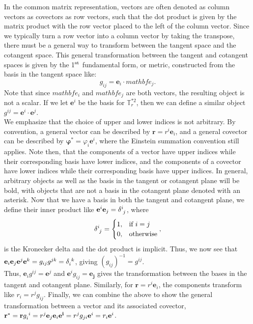 \begin{appendices}
In the common matrix representation, vectors are often denoted as column vectors as covectors as row vectors, such that the dot product is given by the matrix product with the row vector placed to the left of the column vector.
Since we typically turn a row vector into a column vector by taking the transpose, there must be a general way to transform between the tangent space and the cotangent space.
This general transformation between the tangent and cotangent spaces is given by the 1$^{\rm st}$ fundamental form, or metric, constructed from the basis in the tangent space like:
\begin{equation}
  g_{ij} = \mathbf{e}_i \cdot mathbf{e}_j.\label{e:A-metric}
\end{equation}
Note that since $mathbf{e}_i$ and $mathbf{e}_j$ are both vectors, the resulting object is not a scalar.
If we let $\mathbf{e}^i$ be the basis for $\mathbb{T}^{*2}_r$, then we can define a similar object $g^{ij} = \mathbf{e}^i \cdot \mathbf{e}^j$. \\

We emphasize that the choice of upper and lower indices is not arbitrary.
By convention, a general vector can be described by $\mathbf{r} = r^{i}\mathbf{e}_i$, and a general covector can be described by $\bm{\varphi}^* = \varphi_{i}\mathbf{e}^i$, where the Einstein summation convention still applies.
Note then, that the components of a vector have upper indices while their corresponding basis have lower indices, and the components of a covector have lower indices while their corresponding basis have upper indices.
In general, arbitrary objects as well as the basis in the tangent or cotangent plane will be bold, with objects that are not a basis in the cotangent plane denoted with an asterisk.
Now that we have a basis in both the tangent and cotangent plane, we define their inner product like $\mathbf{e}^i \mathbf{e}_j = \tensor{\delta}{^i_j}$, where
\begin{equation}
  \tensor{\delta}{^i_j} = \begin{cases}
    1, & \textrm{if } i = j \\
    0, & \textrm{otherwise}
  \end{cases},
\end{equation}
is the Kronecker delta and the dot product is implicit.
Thus, we now see that $\mathbf{e}_i\mathbf{e}_j\mathbf{e}^j\mathbf{e}^k = g_{ij}g^{jk} = \tensor{\delta}{_i^k}$, giving $(g_{ij})^{-1} = g^{ij}$. \\

Thus, $\mathbf{e}_i g^{ij} = \mathbf{e}^j$ and $\mathbf{e}^ig_{ij} = \mathbf{e_j}$ gives the transformation between the bases in the tangent and cotangent plane.
Similarly, for $\mathbf{r} = r^i\mathbf{e}_i$, the components transform like $r_i = r^jg_{ij}$.
Finally, we can combine the above to show the general transformation between a vector and its associated covector, $\mathbf{r}^* =\mathbf{r}\tensor{g}{_i^i} = r^j\mathbf{e}_j\mathbf{e}_i\mathbf{e^i} = r^jg_{ji}\mathbf{e}^i = r_i\mathbf{e}^i$. \\


\end{appendices}
